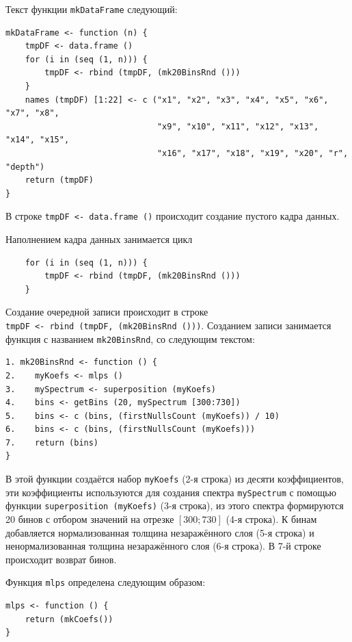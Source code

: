 \documentclass[12pt]{article}
\begin{document}
\begin{enumerate}
  Текст функции \verb|mkDataFrame| следующий:

\begin{verbatim}
mkDataFrame <- function (n) {
    tmpDF <- data.frame ()
    for (i in (seq (1, n))) {
        tmpDF <- rbind (tmpDF, (mk20BinsRnd ()))
    }
    names (tmpDF) [1:22] <- c ("x1", "x2", "x3", "x4", "x5", "x6", "x7", "x8",
                               "x9", "x10", "x11", "x12", "x13", "x14", "x15",
                               "x16", "x17", "x18", "x19", "x20", "r", "depth")
    return (tmpDF)
}
\end{verbatim}

  В строке \verb|tmpDF <- data.frame ()| происходит создание пустого кадра данных.

  Наполнением кадра данных занимается цикл

\begin{verbatim}
    for (i in (seq (1, n))) {
        tmpDF <- rbind (tmpDF, (mk20BinsRnd ()))
    }
\end{verbatim}

  Создание очередной записи происходит в строке \\ \verb|tmpDF <- rbind (tmpDF, (mk20BinsRnd ()))|. Созданием записи занимается функция с названием \verb|mk20BinsRnd|, со следующим текстом:

\begin{verbatim}
1. mk20BinsRnd <- function () {
2.    myKoefs <- mlps ()
3.    mySpectrum <- superposition (myKoefs)
4.    bins <- getBins (20, mySpectrum [300:730])
5.    bins <- c (bins, (firstNullsCount (myKoefs)) / 10)
6.    bins <- c (bins, (firstNullsCount (myKoefs)))
7.    return (bins)
}
\end{verbatim}

  В этой функции создаётся набор \verb|myKoefs| (2-я строка) из десяти коэффициентов, эти коэффициенты используются для создания спектра \verb|mySpectrum| с помощью функции \verb|superposition (myKoefs)| (3-я строка), из этого спектра формируются 20 бинов с отбором значений на отрезке $[300;730]$ (4-я строка). К бинам добавляется нормализованная толщина незаражённого слоя (5-я строка) и ненормализованная толщина незаражённого слоя (6-я строка). В 7-й строке происходит возврат бинов.

  Функция \verb|mlps| определена следующим образом:

\begin{verbatim}
mlps <- function () {
    return (mkCoefs())
}
\end{verbatim}


\end{enumerate}
\end{document}
